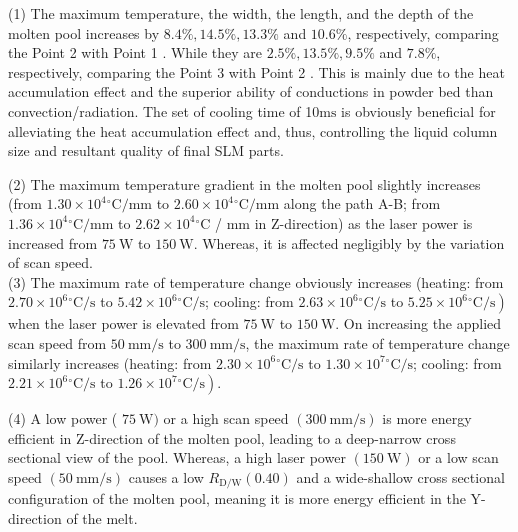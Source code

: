 \documentclass[10pt]{article}
\begin{document}
(1) The maximum temperature, the width, the length, and the depth of the molten pool increases by $8.4 \%, 14.5 \%, 13.3 \%$ and $10.6 \%$, respectively, comparing the Point 2 with Point 1 . While they are $2.5 \%, 13.5 \%, 9.5 \%$ and $7.8 \%$, respectively, comparing the Point 3 with Point 2 . This is mainly due to the heat accumulation effect and the superior ability of conductions in powder bed than convection/radiation. The set of cooling time of 10$\mathrm{ms}$ is obviously beneficial for alleviating the heat accumulation effect and, thus, controlling the liquid column size and resultant quality of final SLM parts.

(2) The maximum temperature gradient in the molten pool slightly increases (from $1.30 \times 10^{4}{ }^{\circ} \mathrm{C} / \mathrm{mm}$ to $2.60 \times 10^{4}{ }^{\circ} \mathrm{C} / \mathrm{mm}$ along the path A-B; from $1.36 \times 10^{4}{ }^{\circ} \mathrm{C} / \mathrm{mm}$ to $2.62 \times 10^{4}{ }^{\circ} \mathrm{C}$ / $\mathrm{mm}$ in Z-direction) as the laser power is increased from $75 \mathrm{~W}$ to $150 \mathrm{~W}$. Whereas, it is affected negligibly by the variation of scan speed.\\
(3) The maximum rate of temperature change obviously increases (heating: from $2.70 \times 10^{6}{ }^{\circ} \mathrm{C} / \mathrm{s}$ to $5.42 \times 10^{6}{ }^{\circ} \mathrm{C} / \mathrm{s}$; cooling: from $2.63 \times 10^{6}{ }^{\circ} \mathrm{C} / \mathrm{s}$ to $\left.5.25 \times 10^{6}{ }^{\circ} \mathrm{C} / \mathrm{s}\right)$ when the laser power is elevated from $75 \mathrm{~W}$ to $150 \mathrm{~W}$. On increasing the applied scan speed from $50 \mathrm{~mm} / \mathrm{s}$ to $300 \mathrm{~mm} / \mathrm{s}$, the maximum rate of temperature change similarly increases (heating: from $2.30 \times 10^{6}{ }^{\circ} \mathrm{C} / \mathrm{s}$ to $1.30 \times 10^{7}{ }^{\circ} \mathrm{C} / \mathrm{s}$; cooling: from $2.21 \times 10^{6}{ }^{\circ} \mathrm{C} / \mathrm{s}$ to $\left.1.26 \times 10^{7}{ }^{\circ} \mathrm{C} / \mathrm{s}\right)$.

(4) A low power ( $75 \mathrm{~W})$ or a high scan speed $(300 \mathrm{~mm} / \mathrm{s})$ is more energy efficient in Z-direction of the molten pool, leading to a deep-narrow cross sectional view of the pool. Whereas, a high laser power $(150 \mathrm{~W})$ or a low scan speed $(50 \mathrm{~mm} / \mathrm{s})$ causes a low $R_{\mathrm{D} / \mathrm{W}}(0.40)$ and a wide-shallow cross sectional configuration of the molten pool, meaning it is more energy efficient in the Y-direction of the melt.
\end{document}
